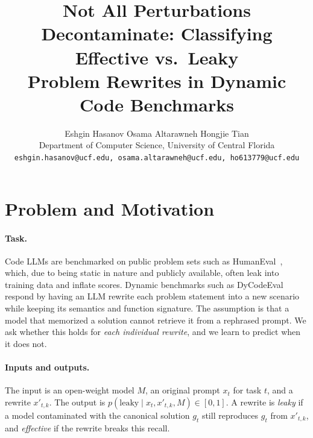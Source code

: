 \documentclass[10pt,twocolumn,letterpaper]{article}
\begin{document}
\title{Not All Perturbations Decontaminate: Classifying Effective vs.\ Leaky\\Problem Rewrites in Dynamic Code Benchmarks}

\author{Eshgin Hasanov \qquad Osama Altarawneh \qquad Hongjie Tian\\
Department of Computer Science, University of Central Florida\\
{\tt\small eshgin.hasanov@ucf.edu, osama.altarawneh@ucf.edu, ho613779@ucf.edu}
}

\maketitle
\ificcvfinal\thispagestyle{empty}\fi


\section{Problem and Motivation}

\paragraph{Task.} Code LLMs are benchmarked on public problem sets such as HumanEval~\cite{humaneval}, which, due to being static in nature and publicly available, often leak into training data and inflate scores. Dynamic benchmarks such as DyCodeEval~\cite{dycodeeval} respond by having an LLM rewrite each problem statement into a new scenario while keeping its semantics and function signature. The assumption is that a model that memorized a solution cannot retrieve it from a rephrased prompt. We ask whether this holds for \emph{each individual rewrite}, and we learn to predict when it does not.

\paragraph{Inputs and outputs.} The input is an open-weight model $M$, an original prompt $x_t$ for task $t$, and a rewrite $x'_{t,k}$. The output is $p(\text{leaky}\mid x_t, x'_{t,k}, M)\in[0,1]$. A rewrite is \emph{leaky} if a model contaminated with the canonical solution $g_t$ still reproduces $g_t$ from $x'_{t,k}$, and \emph{effective} if the rewrite breaks this recall.
\end{document}
